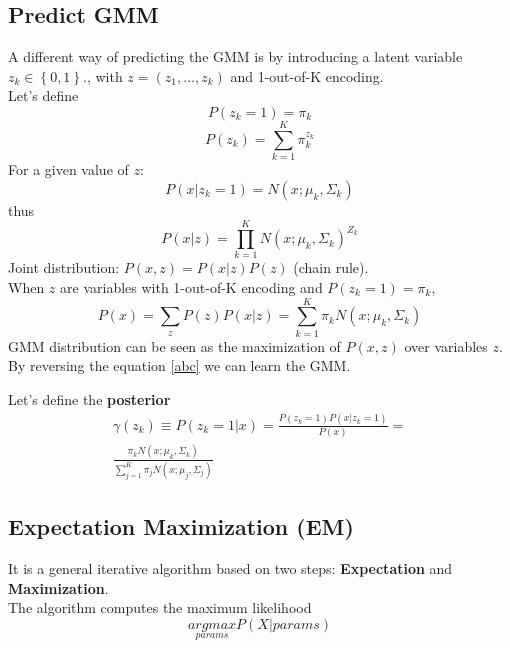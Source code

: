\subsection{Predict GMM}
A different way of predicting the GMM is by introducing a latent variable $z_{k} \in \left\{0, 1\right\}$., with $z = \left(z_{1}, \dots, z_{k}\right)$ and 1-out-of-K encoding.\\
Let's define
\begin{equation}
    P(z_{k} = 1) = \pi_{k}
\end{equation}
\begin{equation}
    P(z_{k}) = \sum_{k=1}^{K}\pi_{k}^{z_{k}}
\end{equation}
For a given value of $z$:
\begin{equation}
    P(x|z_{k} = 1) = N(x; \mu_{k}, \Sigma_{k})
\end{equation}
thus
\begin{equation}
    P(x|z) = \prod_{k=1}^{K}N(x; \mu_{k}, \Sigma_{k})^{Z_{k}}
\end{equation}
Joint distribution: $P(x, z) = P(x|z)P(z)$ (chain rule).\\
When $z$ are variables with 1-out-of-K encoding and $P(z_{k} = 1) = \pi_{k}$,
\begin{equation}
\label{abc}
    P(x) = \sum_{z}P(z)P(x|z) = \sum_{k=1}^{K}\pi_{k}N(x; \mu_{k}, \Sigma_{k})
\end{equation}
GMM distribution can be seen as the maximization of $P(x, z)$ over variables $z$. By reversing the equation \ref{abc} we can learn the GMM.

Let's define the \textbf{posterior} 
\begin{equation}
    \begin{multlined}
        \gamma(z_{k}) \equiv P(z_{k} = 1 | x) = \frac{P(z_{k} = 1)P(x|z_{k} = 1)}{P(x)} = \\
        \frac{\pi_{k}N(x;\mu_{k}, \Sigma_{k})}{\sum_{j=1}^{K}\pi_{j}N(x;\mu_{j}, \Sigma_{j})}
    \end{multlined}
\end{equation}

\subsection{Expectation Maximization (EM)}
It is a general iterative algorithm based on two steps: \textbf{Expectation} and \textbf{Maximization}.\\
The algorithm computes the maximum likelihood 
\begin{equation}
    \underset{params}{argmax}P(X|params)
\end{equation}


